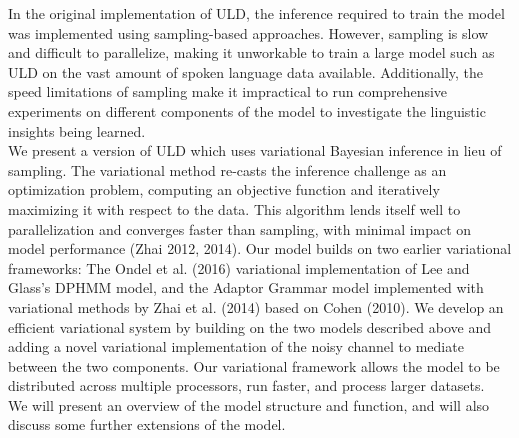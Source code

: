 \documentclass[12pt,letterpaper]{article}
\begin{document}
In the original implementation of ULD, the inference required to train the model was implemented using sampling-based approaches. However, sampling is slow and difficult to parallelize, making it unworkable to train a large model such as ULD on the vast amount of spoken language data available. Additionally, the speed limitations of sampling make it impractical to run comprehensive experiments on different components of the model to investigate the linguistic insights being learned. \\

We present a version of ULD which uses variational Bayesian inference in lieu of sampling. The variational method re-casts the inference challenge as an optimization problem, computing an objective function and iteratively maximizing it with respect to the data. This algorithm lends itself well to parallelization and converges faster than sampling, with minimal impact on model performance (Zhai 2012, 2014). Our model builds on two earlier variational frameworks: The Ondel et al. (2016) variational implementation of Lee and Glass's DPHMM model, and the Adaptor Grammar model implemented with variational methods by Zhai et al. (2014) based on Cohen (2010). We develop an efficient variational system by building on the two models described above and adding a novel variational implementation of the noisy channel to mediate between the two components. Our variational framework allows the model to be distributed across multiple processors, run faster, and process larger datasets. \\

We will present an overview of the model structure and function, and will also discuss some further extensions of the model.
\end{document}
